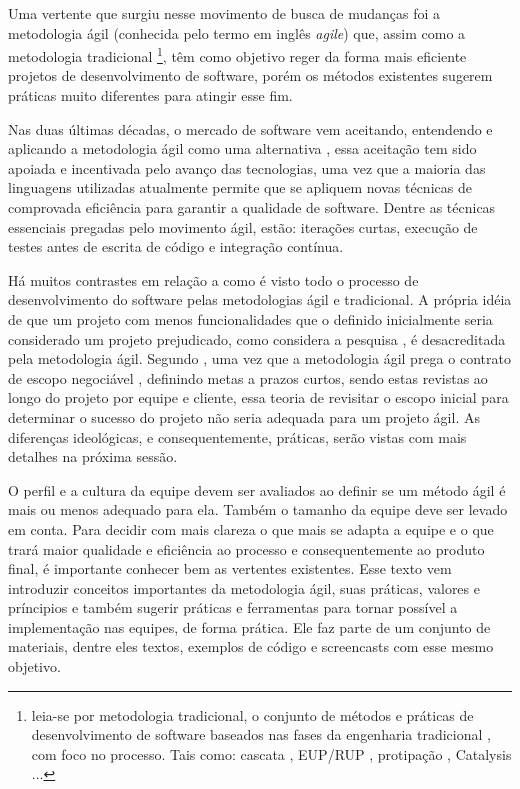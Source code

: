 Uma vertente que surgiu nesse movimento de busca de mudanças foi a metodologia ágil (conhecida pelo termo em inglês \textit{agile}) que, assim como a metodologia tradicional \footnote{leia-se por metodologia tradicional, o conjunto de métodos e práticas de desenvolvimento de software baseados nas fases da engenharia tradicional \cite{Pressman}, com foco no processo. Tais como: cascata \cite{Cascata}, EUP/RUP \cite{EUP}, protipação \cite{Prototipacao}, Catalysis \cite{Catalysis} ...}, têm como objetivo reger da forma mais eficiente projetos de desenvolvimento de software, porém os métodos existentes sugerem práticas muito diferentes para atingir esse fim.

Nas duas últimas décadas, o mercado de software vem aceitando, entendendo e aplicando a metodologia ágil como uma alternativa , essa aceitação tem sido apoiada e incentivada pelo avanço das tecnologias, uma vez que a maioria das linguagens utilizadas atualmente permite que se apliquem novas técnicas de comprovada eficiência para garantir a qualidade de software. Dentre as técnicas essenciais pregadas pelo movimento ágil, estão: iterações curtas, execução de testes antes de escrita de código e integração contínua.

Há muitos contrastes em relação a como é visto todo o processo de desenvolvimento do software pelas metodologias ágil e tradicional. A própria idéia de que um projeto com menos funcionalidades que o definido inicialmente seria considerado um projeto prejudicado, como considera a pesquisa , é desacreditada pela metodologia ágil. Segundo , uma vez que a metodologia ágil prega o contrato de escopo negociável , definindo metas a prazos curtos, sendo estas revistas ao longo do projeto por equipe e cliente, essa teoria de revisitar o escopo inicial para determinar o sucesso do projeto não seria adequada para um projeto ágil. As diferenças ideológicas, e consequentemente, práticas, serão vistas com mais detalhes na próxima sessão.

O perfil e a cultura da equipe devem ser avaliados ao definir se um método ágil é mais ou menos adequado para ela. Também o tamanho da equipe deve ser levado em conta. Para decidir com mais clareza o que mais se adapta a equipe e o que trará maior qualidade e eficiência ao processo e consequentemente ao produto final, é importante conhecer bem as vertentes existentes. Esse texto vem introduzir conceitos importantes da metodologia ágil, suas práticas, valores e príncipios e também sugerir práticas e ferramentas para tornar possível a implementação nas equipes, de forma prática. Ele faz parte de um conjunto de materiais, dentre eles textos, exemplos de código e screencasts com esse mesmo objetivo.

